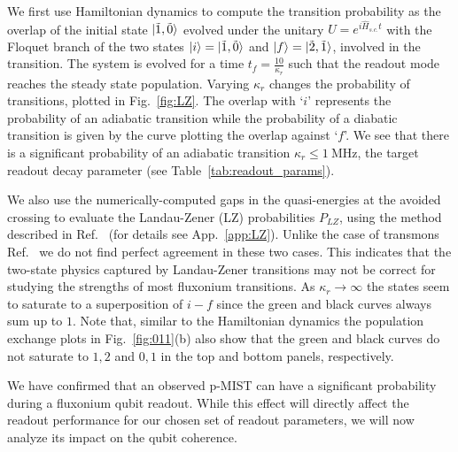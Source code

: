 \documentclass[%
reprint,
superscriptaddress,
 amsmath,amssymb,
 aps,
 prx,
longbibliography,
floatfix,
]{revtex4-2}
\begin{document}
We first use Hamiltonian dynamics to compute the transition probability as the overlap of the initial state  $\ket{\tilde{1},\tilde{0}}$ evolved under the unitary $U=e^{i\hat H_{s.c.}t}$ with the Floquet branch of the two states $\ket{i}=\ket{\tilde{1},\tilde{0}}$ and $\ket{f}=\ket{\tilde{2},\tilde{1}}$, involved in the transition. The system is evolved for a time $t_f=\frac{10}{\kappa_r}$ such that the readout mode reaches the steady state population. Varying $\kappa_r$ changes the probability of transitions, plotted in Fig.~\ref{fig:LZ}. The overlap with `$i$' represents the probability of an adiabatic transition while the probability of a diabatic transition is given by the curve plotting the overlap against `$f$'. We see that there is a significant probability of an adiabatic transition $\kappa_r\le 1 \ \mathrm{MHz}$, the target readout decay parameter (see Table~\ref{tab:readout_params}). 

We also use the numerically-computed gaps in the quasi-energies at the avoided crossing to evaluate the Landau-Zener (LZ) probabilities $P_{LZ}$, using the method described in Ref.~\cite{ikeda2022floquet} (for details see App.~\ref{app:LZ}). Unlike the case of transmons Ref.~\cite{dumas2024unified} we do not find perfect agreement in these two cases. This indicates that the two-state physics captured by Landau-Zener transitions may not be correct for studying the strengths of most fluxonium transitions. As $\kappa_r\rightarrow \infty$ the states seem to saturate to a superposition of $i-f$ since the green and black curves always sum up to $1$. Note that, similar to the Hamiltonian dynamics the population exchange plots in Fig.~\ref{fig:011}(b) also show that the green and black curves do not saturate to $1,2$ and $0,1$ in the top and bottom panels, respectively.

We have confirmed that an observed p-MIST can have a significant probability during a fluxonium qubit readout. While this effect will directly affect the readout performance for our chosen set of readout parameters, we will now analyze its impact on the qubit coherence.
\end{document}
